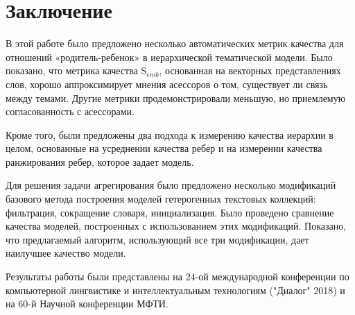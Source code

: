 \chapter{Заключение}

В этой работе было предложено несколько автоматических метрик качества для отношений «родитель-ребенок» в иерархической тематической модели. Было показано, что метрика качества $\mathrm{S}_{emb}$, основанная на векторных представлениях слов, хорошо аппроксимирует мнения асессоров о том, существует ли связь между темами. Другие метрики продемонстрировали меньшую, но приемлемую согласованность с асессорами.

Кроме того, были предложены два подхода к измерению качества иерархии в целом, основанные на усреднении качества ребер и на измерении качества ранжирования ребер, которое задает модель.

Для решения задачи агрегирования было предложено несколько модификаций базового метода построения моделей гетерогенных текстовых коллекций: фильтрация, сокращение словаря, инициализация. Было проведено сравнение качества моделей, построенных с использованием этих модификаций. Показано, что предлагаемый алгоритм, использующий все три модификации, дает наилучшее качество модели.

Результаты работы были представлены на 24-ой международной конференции
по компьютерной лингвистике и интеллектуальным технологиям ("Диалог" 2018) и на 60-й Научной конференции МФТИ.
